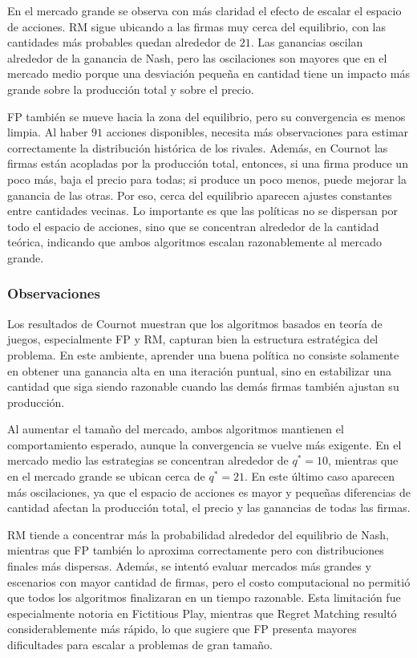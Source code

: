 \documentclass[letterpaper,12pt]{article} %
\begin{document}
En el mercado grande se observa con más claridad el efecto de escalar el espacio de acciones. RM sigue ubicando a las firmas muy cerca del equilibrio, con las cantidades más probables quedan alrededor de $21$. Las ganancias oscilan alrededor de la ganancia de Nash, pero las oscilaciones son mayores que en el mercado medio porque una desviación pequeña en cantidad tiene un impacto más grande sobre la producción total y sobre el precio.

FP también se mueve hacia la zona del equilibrio, pero su convergencia es menos limpia. Al haber $91$ acciones disponibles, necesita más observaciones para estimar correctamente la distribución histórica de los rivales. Además, en Cournot las firmas están acopladas por la producción total, entonces, si una firma produce un poco más, baja el precio para todas; si produce un poco menos, puede mejorar la ganancia de las otras. Por eso, cerca del equilibrio aparecen ajustes constantes entre cantidades vecinas. Lo importante es que las políticas no se dispersan por todo el espacio de acciones, sino que se concentran alrededor de la cantidad teórica, indicando que ambos algoritmos escalan razonablemente al mercado grande.

\subsubsection*{Observaciones}

Los resultados de Cournot muestran que los algoritmos basados en teoría de juegos, especialmente FP y RM, capturan bien la estructura estratégica del problema. En este ambiente, aprender una buena política no consiste solamente en obtener una ganancia alta en una iteración puntual, sino en estabilizar una cantidad que siga siendo razonable cuando las demás firmas también ajustan su producción.

Al aumentar el tamaño del mercado, ambos algoritmos mantienen el comportamiento esperado, aunque la convergencia se vuelve más exigente. En el mercado medio las estrategias se concentran alrededor de $q^*=10$, mientras que en el mercado grande se ubican cerca de $q^*=21$. En este último caso aparecen más oscilaciones, ya que el espacio de acciones es mayor y pequeñas diferencias de cantidad afectan la producción total, el precio y las ganancias de todas las firmas.

RM tiende a concentrar más la probabilidad alrededor del equilibrio de Nash, mientras que FP también lo aproxima correctamente pero con distribuciones finales más dispersas. Además, se intentó evaluar mercados más grandes y escenarios con mayor cantidad de firmas, pero el costo computacional no permitió que todos los algoritmos finalizaran en un tiempo razonable. Esta limitación fue especialmente notoria en Fictitious Play, mientras que Regret Matching resultó considerablemente más rápido, lo que sugiere que FP presenta mayores dificultades para escalar a problemas de gran tamaño.
\end{document}
